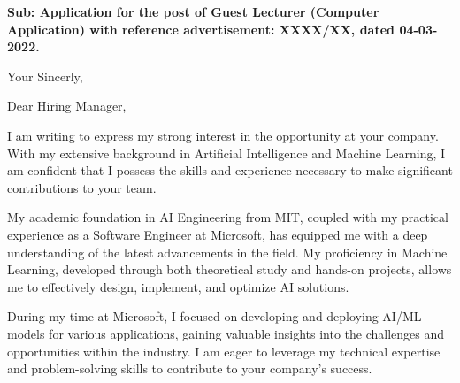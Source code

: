 \documentclass[11pt,a4paper,roman]{moderncv}
\begin{document}
\date{\today}
\opening{\textbf{Sub: Application for the post of Guest Lecturer (Computer Application) with reference advertisement: XXXX/XX, dated 04-03-2022.}}
\closing{Your Sincerly, \vspace{-1em}}


\makelettertitle


Dear Hiring Manager,

\vspace{1em}
I am writing to express my strong interest in the opportunity at your company. With my extensive background in Artificial Intelligence and Machine Learning, I am confident that I possess the skills and experience necessary to make significant contributions to your team.

\vspace{1em}
My academic foundation in AI Engineering from MIT, coupled with my practical experience as a Software Engineer at Microsoft, has equipped me with a deep understanding of the latest advancements in the field. My proficiency in Machine Learning, developed through both theoretical study and hands-on projects, allows me to effectively design, implement, and optimize AI solutions.

\vspace{1em}
During my time at Microsoft, I focused on developing and deploying AI/ML models for various applications, gaining valuable insights into the challenges and opportunities within the industry. I am eager to leverage my technical expertise and problem-solving skills to contribute to your company's success.
\end{document}
